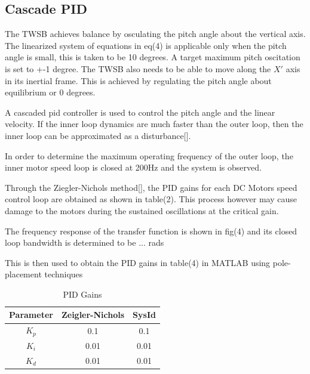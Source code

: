         \subsection{Cascade PID}

        The TWSB achieves balance by osculating the pitch angle about the vertical axis. 
        The linearized system of equations in eq(4) is applicable 
        only when the pitch angle is small, this is taken to be 10 degrees. 
        A target maximum pitch oscitation is set to +-1 degree. 
        The TWSB also needs to be able to move along the $X'$ axis in its inertial frame.
        This is achieved by regulating the pitch angle about equilibrium or 0 degrees.

        A cascaded pid controller is used to control the pitch angle and the linear velocity. 
        If the inner loop dynamics are much faster than the outer loop, 
        then the inner loop can be approximated as a disturbance[].

        In order to determine the maximum operating frequency of the outer loop, 
        the inner motor speed loop is closed at 200Hz and the system is observed.
        
        Through the Ziegler-Nichols method[], the PID gains for each DC Motors speed control loop 
        are obtained as shown in table(2). This process however may cause damage to the motors 
        during the sustained oscillations at the critical gain. 
       
        The frequency response of the transfer function is shown in fig(4) 
        and its closed loop bandwidth is determined to be ... rads

        This is then used to obtain the PID gains in table(4) in MATLAB using pole-placement techniques
        \begin{table}[H]
            \centering
            \begin{tabular}{|c|c|c|}
                \hline
                Parameter & Zeigler-Nichols & SysId \\
                \hline 
                $K_p$ & 0.1 & 0.1 \\
                $K_i$ & 0.01 & 0.01 \\
                $K_d$ & 0.01 & 0.01 \\
                \hline
            \end{tabular}
            \caption{PID Gains}
        \end{table}

